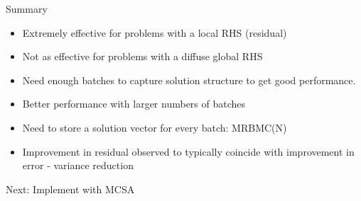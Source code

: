 \documentclass{beamer}
\begin{document}
\begin{frame}{Summary}

  \begin{itemize}
  \item Extremely effective for problems with a local RHS (residual)
  \item Not as effective for problems with a diffuse global RHS
  \item Need enough batches to capture solution structure to get good
    performance.
  \item Better performance with larger numbers of batches
  \item Need to store a solution vector for every batch: MRBMC(N)
  \item Improvement in residual observed to typically coincide with
    improvement in error - variance reduction
  \end{itemize}

  Next: Implement with MCSA

\end{frame}

\end{document}
